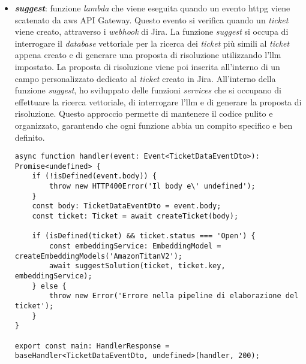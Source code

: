 \begin{itemize}
    \item \textbf{\textit{suggest}}: funzione \textit{lambda} che viene eseguita quando un evento \gls{httpg} viene scatenato da \gls{aws} API Gateway. Questo evento si verifica quando un \textit{ticket} viene creato, attraverso i \textit{webhook} di Jira. La funzione \textit{suggest} si occupa di interrogare il \textit{database} vettoriale per la ricerca dei \textit{ticket} più simili al \textit{ticket} appena creato e di generare una proposta di risoluzione utilizzando l'\gls{llm} impostato. La proposta di risoluzione viene poi inserita all'interno di un campo personalizzato dedicato al \textit{ticket} creato in Jira.
    All'interno della funzione \textit{suggest}, ho sviluppato delle funzioni \textit{services} che si occupano di effettuare la ricerca vettoriale, di interrogare l'\gls{llm} e di generare la proposta di risoluzione. Questo approccio permette di mantenere il codice pulito e organizzato, garantendo che ogni funzione abbia un compito specifico e ben definito.
    \begin{verbatim}
async function handler(event: Event<TicketDataEventDto>): Promise<undefined> {
    if (!isDefined(event.body)) {
        throw new HTTP400Error('Il body e\' undefined');
    }
    const body: TicketDataEventDto = event.body;
    const ticket: Ticket = await createTicket(body);

    if (isDefined(ticket) && ticket.status === 'Open') {
        const embeddingService: EmbeddingModel = createEmbeddingModels('AmazonTitanV2');
        await suggestSolution(ticket, ticket.key, embeddingService);
    } else {
        throw new Error('Errore nella pipeline di elaborazione del ticket');
    }
}

export const main: HandlerResponse = baseHandler<TicketDataEventDto, undefined>(handler, 200);
    \end{verbatim}


\end{itemize}
